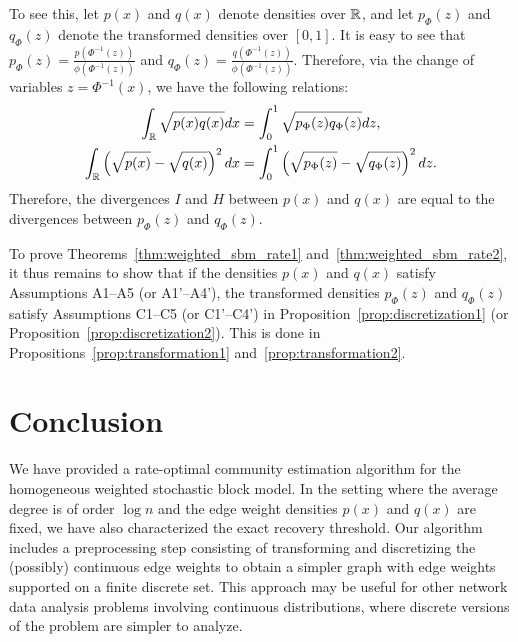 \documentclass{article}
\begin{document}
To see this, let $p(x)$ and $q(x)$ denote densities over ${\mathbb R}$, and let $p_{\Phi}(z)$ and $q_{\Phi}(z)$ denote the transformed densities over $[0,1]$. It is easy to see that $p_{\Phi}(z) = \frac{p(\Phi^{-1}(z))}{\phi(\Phi^{-1}(z))}$ and $q_{\Phi}(z) = \frac{q(\Phi^{-1}(z))}{\phi(\Phi^{-1}(z))}$. Therefore, via the change of variables $z = \Phi^{-1}(x)$, we have the following relations:
\begin{align*}
\int_{\mathbb R} \sqrt{p(x)q(x)} dx &= \int_0^1 \sqrt{p_{\Phi}(z) q_{\Phi}(z)} dz, \\
\int_{\mathbb R} \left(\sqrt{p(x)} - \sqrt{q(x)}\right)^2 dx &= \int_0^1 \left(\sqrt{p_{\Phi}(z)} -\sqrt{q_{\Phi}(z)}\right)^2 dz.
\end{align*}
Therefore, the divergences $I$ and $H$ between $p(x)$ and $q(x)$ are equal to the divergences between $p_{\Phi}(z)$ and $q_{\Phi}(z)$.

To prove Theorems~\ref{thm:weighted_sbm_rate1} and~\ref{thm:weighted_sbm_rate2}, it thus remains to show that if the densities $p(x)$ and $q(x)$ satisfy Assumptions A1--A5 (or A1'--A4'), the transformed densities $p_{\Phi}(z)$ and $q_{\Phi}(z)$ satisfy Assumptions C1--C5 (or C1'--C4') in Proposition~\ref{prop:discretization1} (or Proposition~\ref{prop:discretization2}). This is done in Propositions~\ref{prop:transformation1} and~\ref{prop:transformation2}.


\section{Conclusion}
\label{sec:conclusion}

We have provided a rate-optimal community estimation algorithm for the homogeneous weighted stochastic block model. In the setting where the average degree is of order $\log n$ and the edge weight densities $p(x)$ and $q(x)$ are fixed, we have also characterized the exact recovery threshold. Our algorithm includes a preprocessing step consisting of transforming and discretizing the (possibly) continuous edge weights to obtain a simpler graph with edge weights supported on a finite discrete set. This approach may be useful for other network data analysis problems involving continuous distributions, where discrete versions of the problem are simpler to analyze.
\end{document}
